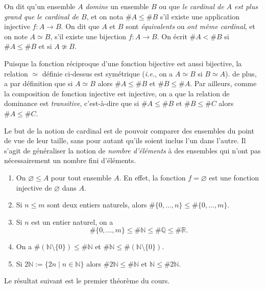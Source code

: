 \documentclass[french,course,oneside,theoremnosection]{lecture}
\newcommand{\R}{\mathbb{R}}
\newcommand{\N}{\mathbb{N}}
\newcommand{\Q}{\mathbb{Q}}
\begin{document}
\begin{definition}
On dit qu'un ensemble $A$ \emph{domine} un ensemble  $B$ ou que \emph{le cardinal de $A$ est plus grand que le cardinal de $B$}, et on nota $\# A \leq \# B$ s'il existe une application injective $f:A\to B$. On dit que $A$ et $B$ sont \emph{équivalents} ou \emph{ont même cardinal}, et on note $A \simeq B$,  s'il existe une bijection $f\colon A \to B$.
On écrit $\#A  <\#B$ si $\#A \leq \#B$ et si $A\not\simeq B$. 
\end{definition}

Puisque la fonction réciproque d'une fonction bijective est aussi bijective, la relation $\simeq$ définie ci-dessus est symétrique (\emph{i.e.}, on a $A\simeq B$ si $B \simeq A$). de plus, a par définition que si $A \simeq B$ alors $\#A \leq \#B$ et $\# B \leq \#A$. Par ailleurs, comme la composition de fonction injective est injective, on a que la relation de dominance est \emph{transitive}, c'est-à-dire que si $\#A \leq \#B$ et $\#B \leq \#C$ alors $\#A \leq \#C$.

Le but de la notion de cardinal est de pouvoir comparer des ensembles du point de vue de leur taille, sans pour autant qu'ils soient inclus l'un dans l'autre. Il s'agit de généraliser la notion de \emph{nombre d'éléments} à des ensembles qui n'ont pas nécessairement un nombre fini d'éléments.

\begin{example}\label{ex:hgf}
\begin{enumerate}
\item On $\varnothing \leq A$ pour tout ensemble $A$. En effet, la fonction $f=\varnothing$ est une fonction injective de $\varnothing$ dans $A$.
\item Si $n \leq m$ sont deux entiers naturels, alors $\#\{0, \ldots, n\} \leq \# \{0, \ldots, m\}$.
\item Si $n$ est un entier naturel, on a
\[
\#\{0, \ldots, m\} \leq \# \N \leq \#\Q \leq \#\R.
\]
\item On a $\#(\N\setminus\{0\}) \leq \#\N$ et $\#\N \leq \#(\N\setminus\{0\})$.
\item Si $2\N:=\{2n \mid n \in \N\}$ alors $\#2\N \leq \#\N$ et $\N \leq \#2\N$.
\end{enumerate}
\end{example}

Le résultat suivant est le premier théorème du cours. 
\end{document}
